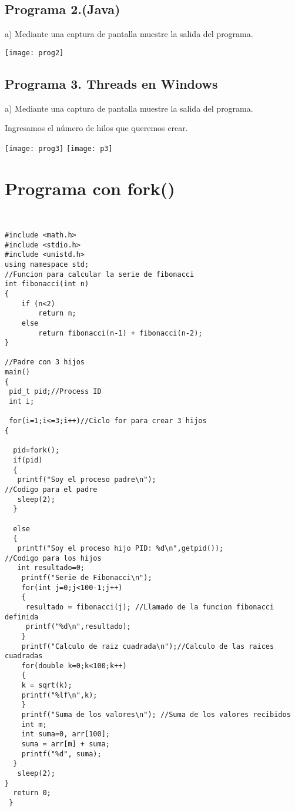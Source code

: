 \documentclass[12pt]{article} %
\begin{document}
\subsection{Programa 2.(Java)}

a) Mediante una captura de pantalla muestre la salida del programa.

\texttt{[image: prog2]}

\subsection{Programa 3. Threads en Windows}
a) Mediante una captura de pantalla muestre la salida del programa.

Ingresamos el número de hilos que queremos crear.

\texttt{[image: prog3]}
\texttt{[image: p3]}


\section{Programa con fork()}

\begin{lstlisting}


#include <math.h>
#include <stdio.h>
#include <unistd.h>
using namespace std;
//Funcion para calcular la serie de fibonacci
int fibonacci(int n) 
{
    if (n<2)
        return n;
    else
        return fibonacci(n-1) + fibonacci(n-2);
}

//Padre con 3 hijos
main()
{
 pid_t pid;//Process ID
 int i;
 
 for(i=1;i<=3;i++)//Ciclo for para crear 3 hijos
{
  
  pid=fork(); 
  if(pid)
  {
   printf("Soy el proceso padre\n");
//Codigo para el padre
   sleep(2);
  }

  else 
  {
   printf("Soy el proceso hijo PID: %d\n",getpid());
//Codigo para los hijos
   int resultado=0;
    printf("Serie de Fibonacci\n");
    for(int j=0;j<100-1;j++)
    {
     resultado = fibonacci(j); //Llamado de la funcion fibonacci definida
     printf("%d\n",resultado);
    }
    printf("Calculo de raiz cuadrada\n");//Calculo de las raices cuadradas
    for(double k=0;k<100;k++)
    {
    k = sqrt(k);
    printf("%lf\n",k);
    }
    printf("Suma de los valores\n"); //Suma de los valores recibidos
    int m;
    int suma=0, arr[100];
    suma = arr[m] + suma; 
    printf("%d", suma);
  }
   sleep(2);
}
  return 0;
 }
\end{lstlisting}
\end{document}
